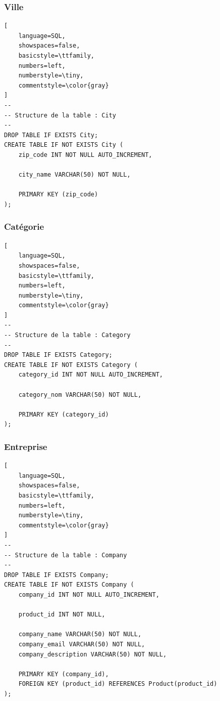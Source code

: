 \subsubsection*{Ville}
\begin{lstlisting}[
    language=SQL,
    showspaces=false,
    basicstyle=\ttfamily,
    numbers=left,
    numberstyle=\tiny,
    commentstyle=\color{gray}
]
--
-- Structure de la table : City
--
DROP TABLE IF EXISTS City;
CREATE TABLE IF NOT EXISTS City (
    zip_code INT NOT NULL AUTO_INCREMENT,

    city_name VARCHAR(50) NOT NULL,

    PRIMARY KEY (zip_code)
);
\end{lstlisting}

\subsubsection*{Catégorie}
\begin{lstlisting}[
    language=SQL,
    showspaces=false,
    basicstyle=\ttfamily,
    numbers=left,
    numberstyle=\tiny,
    commentstyle=\color{gray}
]
--
-- Structure de la table : Category
--
DROP TABLE IF EXISTS Category;
CREATE TABLE IF NOT EXISTS Category (
    category_id INT NOT NULL AUTO_INCREMENT,

    category_nom VARCHAR(50) NOT NULL,

    PRIMARY KEY (category_id)
);
\end{lstlisting}

\subsubsection*{Entreprise}
\begin{lstlisting}[
    language=SQL,
    showspaces=false,
    basicstyle=\ttfamily,
    numbers=left,
    numberstyle=\tiny,
    commentstyle=\color{gray}
]
--
-- Structure de la table : Company
--
DROP TABLE IF EXISTS Company;
CREATE TABLE IF NOT EXISTS Company (
    company_id INT NOT NULL AUTO_INCREMENT,

    product_id INT NOT NULL,

    company_name VARCHAR(50) NOT NULL,
    company_email VARCHAR(50) NOT NULL,
    company_description VARCHAR(50) NOT NULL,

    PRIMARY KEY (company_id),
    FOREIGN KEY (product_id) REFERENCES Product(product_id)
);
\end{lstlisting}


